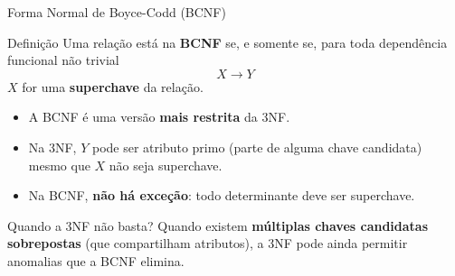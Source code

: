 \documentclass[9pt]{beamer}
\begin{document}
\begin{frame}{Forma Normal de Boyce-Codd (BCNF)}
  \begin{block}{Definição}
    Uma relação está na \textbf{BCNF} se, e somente se, para toda dependência funcional não trivial
    \[
      X \to Y
    \]
    $X$ for uma \textbf{superchave} da relação.
  \end{block}
  \vspace{0.3cm}
  \begin{itemize}
    \item A BCNF é uma versão \textbf{mais restrita} da 3NF.
    \item Na 3NF, $Y$ pode ser atributo primo (parte de alguma chave candidata) mesmo que $X$ não seja superchave.
    \item Na BCNF, \textbf{não há exceção}: todo determinante deve ser superchave.
  \end{itemize}
  \vspace{0.3cm}
  \begin{alertblock}{Quando a 3NF não basta?}
    Quando existem \textbf{múltiplas chaves candidatas sobrepostas} (que compartilham atributos), a 3NF pode ainda permitir anomalias que a BCNF elimina.
  \end{alertblock}
\end{frame}
\end{document}
